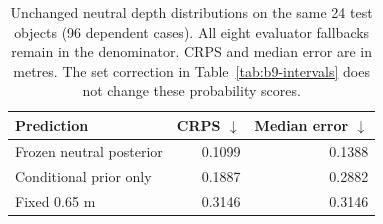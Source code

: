 \begin{table}[tbp]
\centering\small
\caption{Unchanged neutral depth distributions on the same 24 test objects (96 dependent cases). All eight evaluator fallbacks remain in the denominator. CRPS and median error are in metres. The set correction in Table~\ref{tab:b9-intervals} does not change these probability scores.}
\label{tab:b9-original-pmf}
\begin{tabular}{lrr}
\toprule
Prediction & CRPS $\downarrow$ & Median error $\downarrow$ \\
\midrule
Frozen neutral posterior & 0.1099 & 0.1388 \\
Conditional prior only & 0.1887 & 0.2882 \\
Fixed 0.65 m & 0.3146 & 0.3146 \\
\bottomrule
\end{tabular}
\end{table}
